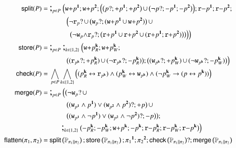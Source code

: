 \documentclass{llncs}
\newcommand{\progStore}{\mathsf{store}}
\newcommand{\progOkChange}{\mathsf{check}}
\newcommand{\progsplit}{\mathsf{split}}
\newcommand{\progmerge}{\mathsf{merge}}
\newcommand{\progFlatten}{\mathsf{flatten}}
\newcommand{\cp}[2]{{#2}^\mathbf{#1}}
\newcommand{\cpr}[2]{\cp{#1}{#2}_R}
\newcommand{\cpw}[2]{\cp{#1}{#2}_W}
\newcommand{\pll}{ {||} }							%
\newcommand{\readable}[1]{\mathtt{r}_{#1}}
\newcommand{\writable}[1]{\mathtt{w}_{#1}}
\newcommand{\testpdl}{?}				%
\newcommand{\assgntopR}[1]{{\mathtt r {+} #1}}
\newcommand{\assgnbotR}[1]{{\mathtt r {-} #1}}
\newcommand{\assgntopW}[1]{{\mathtt w {+} #1}}
\newcommand{\assgntopV}[1]{{\mathtt {+} #1}}
\newcommand{\assgnbotV}[1]{{\mathtt {-} #1}}
\newcommand{\assgnpropV}[2]{(#1 \testpdl ; \assgntopV{#2}) \ndet (\lnot #1 \testpdl ; \assgnbotV{#2})}
\newcommand{\leqv}{ \leftrightarrow }
\newcommand{\limp}{ \rightarrow }
\newcommand{\ndet}{\,{\cup}\,}
\newcommand{\propset}{\mathbb P}
\newcommand{\propsetOf}[1]{\propset_{#1}}
\newcommand{\seqseq}[1]{ \text{\Large ;}_{#1} ~ }
\begin{document}
\begin{table}[t]
\begin{align*}
\progsplit(P) =&\ \seqseq{p \in P} \Big(
  \assgntopW{\cp 1 p} ; \assgntopW{\cp 2 p} ;
\Big(
  \big( p \testpdl ; \assgntopV{ \cp{1}{p} } ; \assgntopV{ \cp{2}{p} } \big) \ndet 
  \big( \lnot p \testpdl ; \assgnbotV{ \cp{1}{p} } ; \assgnbotV{ \cp{2}{p} } \big) 
\Big) ; \assgnbotR{\cp 1 {p}} ; \assgnbotR{\cp 2 {p}} ;
\\& ~~~~~~~~~~~
\Big(
  \lnot \readable p  \testpdl \ndet
  \big(\writable{p} \testpdl ; ( \assgntopW{\cp 1 {p}} \ndet \assgntopW{\cp 2 {p}} ) \big) 			 \ndet
  \\& ~~~~~~~~~~~~~
  \big(\lnot \writable{p} {\land} \readable p  \testpdl ; \big( \assgntopR{\cp 1 {p}} \ndet \assgntopR{\cp 2 {p}} \ndet 
																			  (\assgntopR{\cp 1 {p}}  ; \assgntopR{\cp 2 {p}}) \big) \big) 
\Big)
\Big)
\\
\progStore(P) =&\ \seqseq{p \in P} \seqseq{k \in \{1, 2\}} \Big(
  \assgntopW{\cpr k p} ; \assgntopW{\cpw k p} ;
\\& ~~~~~~~~~~~ 
  \big( \assgnpropV{\readable{\cp k p}}{\cpr k p} \big) ; \big( \assgnpropV{\writable{\cp k p}}{\cpw k p} \big)
\Big)
\\
\progOkChange(P) =&\ \bigwedge_{p \in P} \bigwedge_{k \in \{1, 2\}} \Big(
( \cpr k p \leqv \readable{ \cp k {p} } ) 	\land 
( \cpw k p \leqv \writable{ \cp k {p} } ) 	\land 	
( \lnot \cpw k {p} \limp (p \leqv \cp k {p}) )
\Big)
\\
\progmerge(P) =&\ \seqseq{p \in P} \Big(\big( 
\lnot \writable{p} \testpdl \ndet 
\\& ~~~~~~~~~~~ 
\big(	(\writable{ \cp{1}{p} } \land \cp{1}{p}) \lor 
		(\writable{ \cp{2}{p} } \land \cp{2}{p}) \testpdl ; \assgntopV p \big) \ndet 
\\& ~~~~~~~~~~~ 
\big(	(\writable{ \cp{1}{p} } \land \lnot \cp{1}{p}) \lor 
		(\writable{ \cp{2}{p} } \land \lnot \cp{2}{p}) \testpdl ; \assgnbotV p \big)
\big) ;
\\& ~~~~~~~~
\seqseq{k \in \{1, 2\}} \big(
  \assgnbotV{\cpr k p} ; \assgnbotV{\cpw k p} ; \assgntopW{\cp k p} ; \assgnbotV{\cp k p} ;
  \assgnbotR{\cpr k p} ; \assgnbotR{\cpw k p} ; \assgnbotR{\cp k p}
\big)
\Big)
\\
\progFlatten(\pi_1, \pi_2) =&\ %
  \progsplit\left(\propsetOf{\pi_1 \pll \pi_2}\right) ;
  \progStore\left(\propsetOf{\pi_1 \pll \pi_2}\right) ;
  \cp 1 {\pi_1} ; \cp 2 {\pi_2} ;
  \progOkChange\left(\propsetOf{\pi_1 \pll \pi_2}\right) \testpdl ;
  \progmerge\left(\propsetOf{\pi_1 \pll \pi_2}\right)
\end{align*}
\caption{Useful programs, for all $P \subseteq \propset$ and all programs $\pi_1$ and $\pi_2$.
\label{fig:useful_programs}
}
\end{table}
\end{document}
